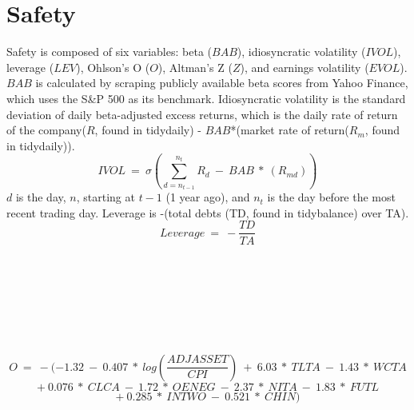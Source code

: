 \documentclass[12pt]{article}
\begin{document}
\section*{Safety}
Safety is composed of six variables: beta ($BAB$), idiosyncratic volatility ($IVOL$), leverage ($LEV$), Ohlson's O ($O$), Altman's Z ($Z$), and earnings volatility ($EVOL$). $BAB$ is calculated by scraping publicly available beta scores from Yahoo Finance, which uses the S\&P 500 as its benchmark. Idiosyncratic volatility is the standard deviation of daily beta-adjusted excess returns, which is the daily rate of return of the company($R$, found in tidydaily) - $BAB$*(market rate of return($R_m$, found in tidydaily)). $$IVOL \ = \ \sigma(\sum_{d=n_{t-1}}^{n_t}R_d \ - \ BAB \ * \ (R_{md}))$$ $d$ is the day, $n$, starting at $t-1$ (1 year ago), and $n_t$ is the day before the most recent trading day. Leverage is -(total debts (TD, found in tidybalance) over TA). $$Leverage \ = \ -\frac{TD}{TA}$$ 
\\
\\
\\
\\
\\
\\
\\
$$ O \ = \ -(-1.32 \ - \ 0.407 \ * \ log(\frac{ADJASSET}{CPI}) \ + \ 6.03 \ * \ TLTA \ - \ 1.43 \ * \ WCTA$$
$$ + \ 0.076 \ * \ CLCA \ - \ 1.72 \ * \ OENEG \ - \ 2.37 \ * \ NITA \ - \ 1.83 \ * \ FUTL$$
$$ + \ 0.285 \ * \ INTWO \ - \ 0.521 \ * \ CHIN)$$ 
\end{document}
